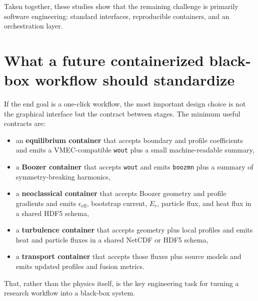 \documentclass[11pt]{article}
\begin{document}
Taken together, these studies show that the remaining challenge is primarily
software engineering: standard interfaces, reproducible containers, and an
orchestration layer.

\section{What a future containerized black-box workflow should standardize}

If the end goal is a one-click workflow, the most important design choice is
not the graphical interface but the contract between stages. The minimum useful
contracts are:

\begin{itemize}
  \item an \textbf{equilibrium container} that accepts boundary and profile coefficients and emits a VMEC-compatible \texttt{wout} plus a small machine-readable summary,
  \item a \textbf{Boozer container} that accepts \texttt{wout} and emits \texttt{boozmn} plus a summary of symmetry-breaking harmonics,
  \item a \textbf{neoclassical container} that accepts Boozer geometry and profile gradients and emits $\epsilon_{\mathrm{eff}}$, bootstrap current, $E_r$, particle flux, and heat flux in a shared HDF5 schema,
  \item a \textbf{turbulence container} that accepts geometry plus local profiles and emits heat and particle fluxes in a shared NetCDF or HDF5 schema,
  \item a \textbf{transport container} that accepts those fluxes plus source models and emits updated profiles and fusion metrics.
\end{itemize}

That, rather than the physics itself, is the key engineering task for turning a
research workflow into a black-box system.



\end{document}
